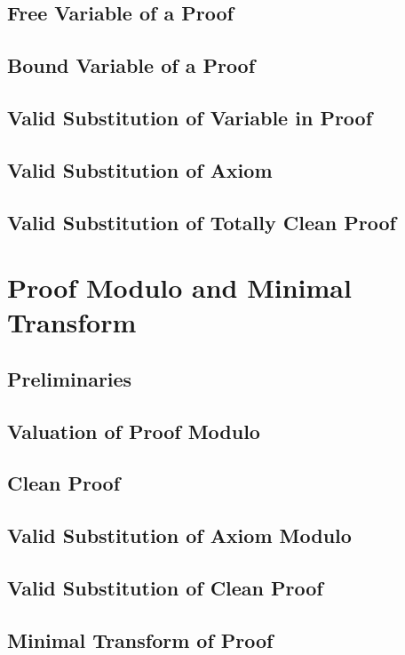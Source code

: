 \documentclass{report}
\begin{document}
    \subsection{Free Variable of a Proof}
    \subsection{Bound Variable of a Proof}
    \subsection{Valid Substitution of Variable in Proof}
    \subsection{Valid Substitution of Axiom}
    \subsection{Valid Substitution of Totally Clean Proof}
\section{Proof Modulo and Minimal Transform}
    \subsection{Preliminaries}
    \subsection{Valuation of Proof Modulo}
    \subsection{Clean Proof}
    \subsection{Valid Substitution of Axiom Modulo}
    \subsection{Valid Substitution of Clean Proof}
    \subsection{Minimal Transform of Proof}
\end{document}
